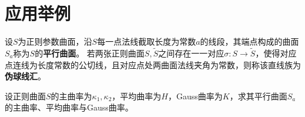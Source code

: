 \documentclass[../../main.tex]{subfiles}%
\begin{document}
\section{应用举例}

\begin{definition}
设$S$为正则参数曲面，沿$S$每一点法线截取长度为常数$a$的线段，其端点构成的曲面$S_a$称为$S$的\textbf{平行曲面}。
若两张正则曲面$S,\tilde{S}$之间存在一一对应$\sigma:S\to\tilde{S}$，使得对应点连线为长度常数的公切线，且对应点处两曲面法线夹角为常数，则称该直线族为\textbf{伪球线汇}。
\end{definition}

\begin{example}
设正则曲面$S$的主曲率为$\kappa_1,\kappa_2$，平均曲率为$H$，Gauss曲率为$K$，求其平行曲面$S_a$的主曲率、平均曲率与Gauss曲率。
\end{example}
\end{document}
